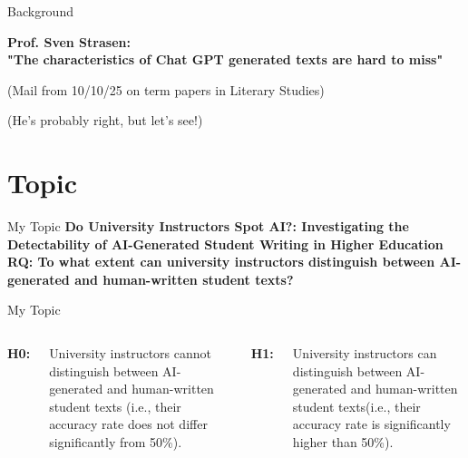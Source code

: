 \documentclass[14pt, aspectratio=169]{beamer}
\begin{document}
\begin{frame}{Background}
    \begin{center}
    \textbf{Prof. Sven Strasen:}\\
    \vspace{0.5cm}
    \pause
    \textbf{"The characteristics of Chat GPT generated texts are hard to miss"} \\
    \vspace{0.5cm}
    \begin{tiny}
    (Mail from 10/10/25 on term papers in Literary Studies)\\
    \end{tiny}
    \vspace{0.5cm}
    \begin{small}
      \pause
    (He's probably right, but let's see!)
    \end{small}
    \end{center}
\end{frame}


\section{Topic}
\begin{frame}{My Topic}
  \textbf{Do University Instructors Spot AI?: Investigating the Detectability of AI-Generated Student Writing in Higher Education}\\
  \vspace {0.5cm}
  \pause
  \textbf{RQ: To what extent can university instructors distinguish between AI-generated and human-written student texts?}
\end{frame}

\begin{frame}{My Topic}
  \begin{columns}[T]
    \textbf{H0:}\\
    \begin{small}
      University instructors cannot distinguish between AI-generated and human-written student texts (i.e., their accuracy rate does not differ significantly from 50\%).
    \end{small}
    \textbf{H1:}\\
    \begin{small}
      University instructors can distinguish between AI-generated and human-written student texts(i.e., their accuracy rate is significantly higher than 50\%).
    \end{small}
  \end{columns}
\end{frame}
\end{document}
